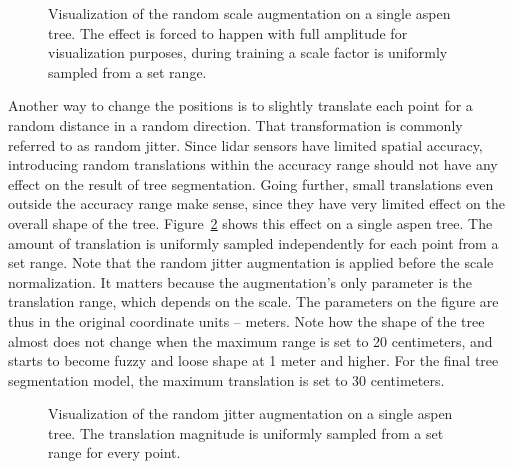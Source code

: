 \begin{figure}
\caption[Visualization of the random scale augmentation on a single aspen tree.]{\label{fig-random-scale-effect}Visualization of the random
scale augmentation on a single aspen tree. The effect is forced to
happen with full amplitude for visualization purposes, during training a
scale factor is uniformly sampled from a set range.}
\end{figure}

Another way to change the positions is to slightly translate each point for a random distance in a random direction.
That transformation is commonly referred to as random jitter.
Since \gls{lidar} sensors have limited spatial accuracy, introducing random translations within the accuracy range should not have any effect on the result of tree segmentation.
Going further, small translations even outside the accuracy range make sense, since they have very limited effect on the overall shape of the tree.
Figure~\ref{fig-random-jitter-effect} shows this effect on a single aspen tree.
The amount of translation is uniformly sampled independently for each point from a set range.
Note that the random jitter augmentation is applied before the scale normalization.
It matters because the augmentation's only parameter is the translation range, which depends on the scale.
The parameters on the figure are thus in the original coordinate units – meters.
Note how the shape of the tree almost does not change when the maximum range is set to 20 centimeters, and starts to become fuzzy and loose shape at 1 meter and higher.
For the final tree segmentation model, the maximum translation is set to 30 centimeters.

\begin{figure}
\caption[Visualization of the random jitter augmentation on a single aspen tree.]{\label{fig-random-jitter-effect}Visualization of the random
jitter augmentation on a single aspen tree. The translation magnitude is
uniformly sampled from a set range for every point.}
\end{figure}

